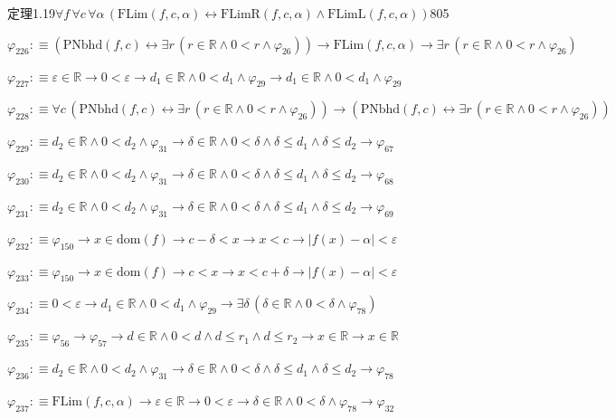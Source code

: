 \begin{fullproof}{定理1.19}{$\forall f\,\forall c\,\forall \alpha\,(\mathrm{FLim}(f,c,\alpha) \leftrightarrow \mathrm{FLimR}(f,c,\alpha) \land \mathrm{FLimL}(f,c,\alpha))$}{805}
\begin{abbrevlist}
\item $\varphi_{226} :\equiv (\mathrm{PNbhd}(f,c) \leftrightarrow \exists r\,(r \in \mathbb{R} \land 0 < r \land \varphi_{26})) \to \mathrm{FLim}(f,c,\alpha) \to \exists r\,(r \in \mathbb{R} \land 0 < r \land \varphi_{26})$
\item $\varphi_{227} :\equiv \varepsilon \in \mathbb{R} \to 0 < \varepsilon \to d_{1} \in \mathbb{R} \land 0 < d_{1} \land \varphi_{29} \to d_{1} \in \mathbb{R} \land 0 < d_{1} \land \varphi_{29}$
\item $\varphi_{228} :\equiv \forall c\,(\mathrm{PNbhd}(f,c) \leftrightarrow \exists r\,(r \in \mathbb{R} \land 0 < r \land \varphi_{26})) \to (\mathrm{PNbhd}(f,c) \leftrightarrow \exists r\,(r \in \mathbb{R} \land 0 < r \land \varphi_{26}))$
\item $\varphi_{229} :\equiv d_{2} \in \mathbb{R} \land 0 < d_{2} \land \varphi_{31} \to \delta \in \mathbb{R} \land 0 < \delta \land \delta \leq d_{1} \land \delta \leq d_{2} \to \varphi_{67}$
\item $\varphi_{230} :\equiv d_{2} \in \mathbb{R} \land 0 < d_{2} \land \varphi_{31} \to \delta \in \mathbb{R} \land 0 < \delta \land \delta \leq d_{1} \land \delta \leq d_{2} \to \varphi_{68}$
\item $\varphi_{231} :\equiv d_{2} \in \mathbb{R} \land 0 < d_{2} \land \varphi_{31} \to \delta \in \mathbb{R} \land 0 < \delta \land \delta \leq d_{1} \land \delta \leq d_{2} \to \varphi_{69}$
\item $\varphi_{232} :\equiv \varphi_{150} \to x \in \mathrm{dom}(f) \to c - \delta < x \to x < c \to \lvert f(x) - \alpha \rvert < \varepsilon$
\item $\varphi_{233} :\equiv \varphi_{150} \to x \in \mathrm{dom}(f) \to c < x \to x < c + \delta \to \lvert f(x) - \alpha \rvert < \varepsilon$
\item $\varphi_{234} :\equiv 0 < \varepsilon \to d_{1} \in \mathbb{R} \land 0 < d_{1} \land \varphi_{29} \to \exists \delta\,(\delta \in \mathbb{R} \land 0 < \delta \land \varphi_{78})$
\item $\varphi_{235} :\equiv \varphi_{56} \to \varphi_{57} \to d \in \mathbb{R} \land 0 < d \land d \leq r_{1} \land d \leq r_{2} \to x \in \mathbb{R} \to x \in \mathbb{R}$
\item $\varphi_{236} :\equiv d_{2} \in \mathbb{R} \land 0 < d_{2} \land \varphi_{31} \to \delta \in \mathbb{R} \land 0 < \delta \land \delta \leq d_{1} \land \delta \leq d_{2} \to \varphi_{78}$
\item $\varphi_{237} :\equiv \mathrm{FLim}(f,c,\alpha) \to \varepsilon \in \mathbb{R} \to 0 < \varepsilon \to \delta \in \mathbb{R} \land 0 < \delta \land \varphi_{78} \to \varphi_{32}$

\end{abbrevlist}
\end{fullproof}
